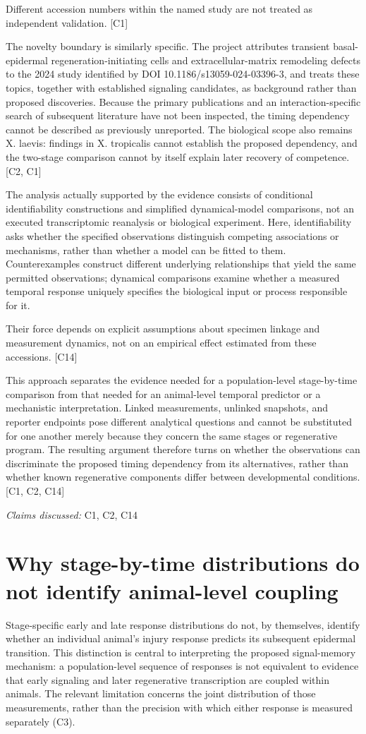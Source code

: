 \documentclass[11pt]{article}
\begin{document}
Different accession numbers within the named study are not treated as independent validation. [C1]

The novelty boundary is similarly specific. The project attributes transient basal-epidermal regeneration-initiating cells and extracellular-matrix remodeling defects to the 2024 study identified by DOI 10.1186/s13059-024-03396-3, and treats these topics, together with established signaling candidates, as background rather than proposed discoveries. Because the primary publications and an interaction-specific search of subsequent literature have not been inspected, the timing dependency cannot be described as previously unreported. The biological scope also remains X. laevis: findings in X. tropicalis cannot establish the proposed dependency, and the two-stage comparison cannot by itself explain later recovery of competence. [C2, C1]

The analysis actually supported by the evidence consists of conditional identifiability constructions and simplified dynamical-model comparisons, not an executed transcriptomic reanalysis or biological experiment. Here, identifiability asks whether the specified observations distinguish competing associations or mechanisms, rather than whether a model can be fitted to them. Counterexamples construct different underlying relationships that yield the same permitted observations; dynamical comparisons examine whether a measured temporal response uniquely specifies the biological input or process responsible for it.

Their force depends on explicit assumptions about specimen linkage and measurement dynamics, not on an empirical effect estimated from these accessions. [C14]

This approach separates the evidence needed for a population-level stage-by-time comparison from that needed for an animal-level temporal predictor or a mechanistic interpretation. Linked measurements, unlinked snapshots, and reporter endpoints pose different analytical questions and cannot be substituted for one another merely because they concern the same stages or regenerative program. The resulting argument therefore turns on whether the observations can discriminate the proposed timing dependency from its alternatives, rather than whether known regenerative components differ between developmental conditions. [C1, C2, C14]

\textit{Claims discussed: }C1, C2, C14
\section{Why stage-by-time distributions do not identify animal-level coupling}
Stage-specific early and late response distributions do not, by themselves, identify whether an individual animal\textquoteright{}s injury response predicts its subsequent epidermal transition. This distinction is central to interpreting the proposed signal-memory mechanism: a population-level sequence of responses is not equivalent to evidence that early signaling and later regenerative transcription are coupled within animals. The relevant limitation concerns the joint distribution of those measurements, rather than the precision with which either response is measured separately (C3).
\end{document}
